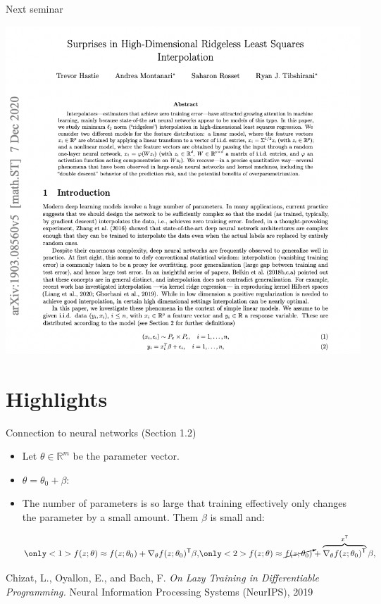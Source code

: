 \documentclass[english,aspectratio=1610]{beamer} %
\newcommand{\trnsp}{\mathsf{T}}
\begin{document}
\begin{frame}{Next seminar}
\begin{center}
	\includegraphics[width=.6\linewidth]{figures/paper.png}
\end{center}
\end{frame}

\section{Highlights}

\begin{frame}{Connection to neural networks (Section 1.2)}
\begin{itemize}
\item Let $\theta \in \mathbb{R}^m$ be the parameter vector.
\item $\theta  = \theta_0 + \beta$:
\item The number of parameters is so large that training effectively only changes the parameter by a small amount. Them $\beta$ is small and:

\begin{equation*}
\only<1>{
f(z; \theta) \approx  f(z; \theta_0) + \nabla_\theta f(z; \theta_0)^\trnsp\beta,}
\only<2>{
f(z; \theta) \approx  \cancelto{}{f(z; \theta_0)} + \overbrace{\nabla_\theta f(z; \theta_0)^\trnsp}^{x^\trnsp}\beta,}
\end{equation*}

\end{itemize}

\tiny{Chizat, L., Oyallon, E., and Bach, F. \textit{On {Lazy} {Training} in {Differentiable} {Programming}.} Neural Information Processing Systems (NeurIPS), 2019}	\\	

\end{frame}
\end{document}
